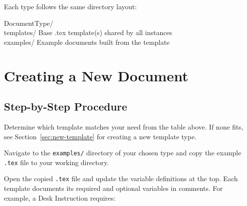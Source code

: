 {Each type follows the same directory layout:

\par\vspace{4pt}\noindent\colorbox{diBgLight}{\begin{minipage}{\dimexpr\linewidth-12pt\relax}\small\ttfamily
DocumentType/\\
    templates/     Base .tex template(s) shared by all instances\\
    examples/      Example documents built from the template\\
\end{minipage}}\par\vspace{4pt}


\section{Creating a New Document}
\label{sec:create}

\subsection{Step-by-Step Procedure}

\begin{enumerate}

Determine which template matches your need from the table above. If none fits, see Section~\ref{sec:new-template} for creating a new template type.

Navigate to the \texttt{examples/} directory of your chosen type and copy the example \texttt{.tex} file to your working directory.


Open the copied \texttt{.tex} file and update the variable definitions at the top. Each template documents its required and optional variables in comments. For example, a Desk Instruction requires:


\end{enumerate}}
